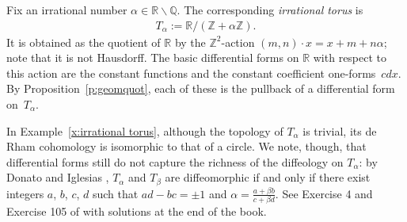 \documentclass[pdftex]{sigma}
\numberwithin{equation}{section}
\newcommand{\QQ}{{\mathbb{Q}}} %
\newcommand{\RR}{{\mathbb{R}}} %
\newcommand{\ZZ}{{\mathbb{Z}}} %
\newcommand{\hypref}[2]{{#2~\ref{#1}}}
\begin{document}
\begin{Example}
\label{x:irrational torus}
Fix an irrational number $\alpha\in\RR{\smallsetminus}\QQ$.
The corresponding \emph{irrational torus} is
\begin{gather*} T_\alpha := \RR / (\ZZ + \alpha \ZZ). \end{gather*}
It is obtained as the quotient of $\RR$
by the $\ZZ^2$-action $(m,n) \cdot x = x + m + n \alpha$;
note that it is not Hausdorf\/f.
The basic dif\/ferential forms on $\RR$ with respect to this action
are the constant functions and the constant coef\/f\/icient one-forms~$cdx$.
By \hypref{p:geomquot}{Proposition}, each of these
is the pullback of a dif\/ferential form on~$T_\alpha$.
\end{Example}

\begin{Remark} \label{rk:irrational torus}
In Example~\ref{x:irrational torus},
although the topology of $T_\alpha$ is trivial,
its de Rham cohomology is isomorphic to that of a circle.
We note, though, that dif\/ferential forms still do not capture
the richness of the dif\/feology on $T_\alpha$:
by Donato and Iglesias \cite{DoIg},
$T_\alpha$ and $T_\beta$ are dif\/feomorphic
if and only if there exist integers $a$, $b$, $c$, $d$
such that $ad-bc = \pm 1$ and $\alpha = \frac{a + \beta b}{c + \beta d}$.
See Exercise 4 and Exercise 105 of \cite{iglesias}
with solutions at the end of the book.
\end{Remark}
\end{document}
